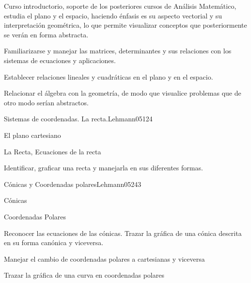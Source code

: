 \begin{syllabus}


\begin{justification}
Curso introductorio, soporte de los posteriores cursos de Análisis Matemático, 
estudia el plano y el espacio, haciendo énfasis es su aspecto vectorial y su interpretación geométrica, 
lo que permite visualizar conceptos que posteriormente se verán en forma abstracta.
\end{justification}

\begin{goals}
\item Familiarizarse y manejar las matrices, determinantes y sus relaciones con los sistemas de ecuaciones y aplicaciones.
\item Establecer relaciones lineales y cuadráticas en el plano y en el espacio.
\item Relacionar el álgebra con la geometría, de modo que visualice problemas que de otro modo serían abstractos.
\end{goals}

\begin{outcomes}
\end{outcomes}

\begin{unit}{Sistemas de coordenadas. La recta.}{Lehmann05}{12}{4}
   \begin{topics}
      \item El plano cartesiano
      \item La Recta, Ecuaciones de la recta
   \end{topics}
   \begin{learningoutcomes}
      \item Identificar, graficar una recta y manejarla en sus diferentes formas.
   \end{learningoutcomes}
\end{unit}

\begin{unit}{Cónicas y Coordenadas polares}{Lehmann05}{24}{3}
   \begin{topics}
      \item Cónicas
      \item Coordenadas Polares
   \end{topics}

   \begin{learningoutcomes}
      \item Reconocer las ecuaciones de las cónicas. Trazar la gráfica de una cónica descrita en su forma canónica y viceversa.
      \item Manejar el cambio de coordenadas polares a cartesianas y viceversa
      \item Trazar la gráfica de una curva en coordenadas polares
      \end{learningoutcomes}
\end{unit}


\end{syllabus}
